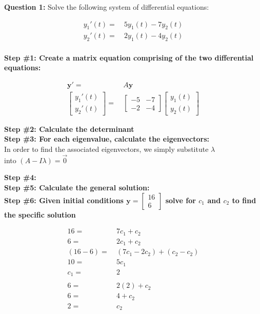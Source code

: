 \documentclass{package/notes}
\begin{document}
\textbf{Question 1:} Solve the following system of differential equations:

\begin{equation*}
	\begin{aligned}
		y_1'(t) =&\: 5y_1(t) - 7y_2(t)\\
		y_2'(t) =&\: 2y_1(t) - 4y_2(t)
	\end{aligned}
\end{equation*}\\

\textbf{Step \#1: Create a matrix equation comprising of the two differential equations:}

\begin{equation*}
	\begin{aligned}
		\mathbf{y'} =&\: A\mathbf{y}\\
		\left[\begin{array}{c}
			y_1'(t) \\ y_2'(t)
		\end{array}\right] =&\: 
		\left[\begin{array}{cc}
			-5 & -7\\ -2 & -4
		\end{array}\right]
		\left[\begin{array}{c}
			y_1(t) \\ y_2(t)
	\end{array}\right]
	\end{aligned}
\end{equation*}

\textbf{Step \#2: Calculate the determinant}\\

\textbf{Step \#3: For each eigenvalue, calculate the eigenvectors:}\\

In order to find the associated eigenvectors, we simply substitute $\lambda$ \\into $(A-I\lambda) = \vec 0$

\textbf{Step \#4: }\\
\textbf{Step \#5: Calculate the general solution:}\\
\textbf{Step \#6: Given initial conditions $\mathbf{y} = \left[\begin{array}{c}16\\6\end{array}\right]$ solve for $c_1$ and $c_2$ to find the specific solution}

\begin{equation*}
	\begin{aligned}
		16 =&\: 7c_1 + c_2\\
		6 =&\: 2c_1 + c_2\\
		(16-6) =&\: (7c_1-2c_2) + (c_2-c_2)\\
		10 =&\: 5c_1\\
		c_1 =&\: 2\\\\
		6 =&\: 2(2) + c_2\\
		6 =&\: 4 + c_2\\
		2 =&\: c_2
	\end{aligned}
\end{equation*}
\end{document}
